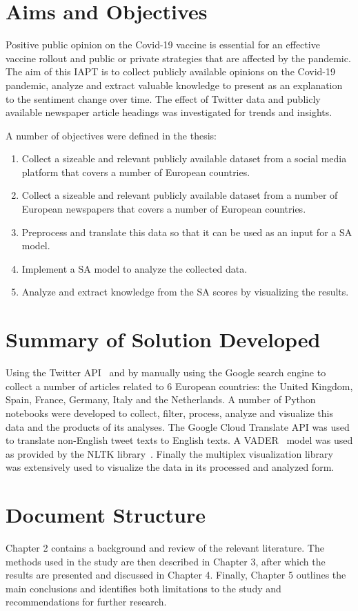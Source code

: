 \section{Aims and Objectives}

Positive public opinion on the Covid-19 vaccine is essential for an effective vaccine rollout and public or private strategies that are affected by the pandemic.
The aim of this \ac{IAPT} is to collect publicly available opinions on the Covid-19 pandemic, analyze and extract valuable knowledge to present as an explanation to the sentiment change over time.
The effect of Twitter data and publicly available newspaper article headings was investigated for trends and insights.

\noindent A number of objectives were defined in the thesis:

\begin{enumerate}
  \item Collect a sizeable and relevant publicly available dataset from a social media platform that covers a number of European countries.
  \item Collect a sizeable and relevant publicly available dataset from a number of European newspapers that covers a number of European countries.
  \item Preprocess and translate this data so that it can be used as an input for a \ac{SA} model.
  \item Implement a \ac{SA} model to analyze the collected data.
  \item Analyze and extract knowledge from the \ac{SA} scores by visualizing the results.
\end{enumerate}

\section{Summary of Solution Developed}

Using the Twitter \ac{API}~\citep{roesslein2020tweepy} and by manually using the Google search engine to collect a number of articles related to 6 European countries: the United Kingdom, Spain, France, Germany, Italy and the Netherlands.
A number of Python notebooks were developed to collect, filter, process, analyze and visualize this data and the products of its analyses.
The Google Cloud Translate \ac{API} was used to translate non-English tweet texts to English texts.
A \ac{VADER}~\citep{Hutto_Gilbert_2014} model was used as provided by the \ac{NLTK} library~\citep{bird2009natural}.
Finally the multiplex visualization library~\citep{Mamo2021} was extensively used to visualize the data in its processed and analyzed form.


\section{Document Structure}

Chapter 2 contains a background and review of the relevant literature.
The methods used in the study are then described in Chapter 3, after which the results are presented and discussed in Chapter 4.
Finally, Chapter 5 outlines the main conclusions and identifies both limitations to the study and recommendations for further research.

